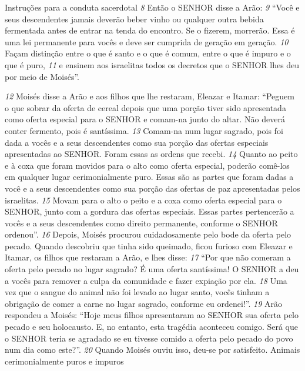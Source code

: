 \bigskip
Instruções para a conduta sacerdotal 
\textit{\tiny 8} 
Então o SENHOR disse a Arão: 
\textit{\tiny 9} 
“Você e seus descendentes jamais deverão beber
vinho ou qualquer outra bebida fermentada antes de entrar na tenda do encontro.
Se o fizerem, morrerão. Essa é uma lei permanente para vocês e deve ser
cumprida de geração em geração. 
\textit{\tiny 10}
Façam distinção entre o que é santo e o que é
comum, entre o que é impuro e o que é puro, 
\textit{\tiny 11}
e ensinem aos israelitas todos os
decretos que o SENHOR lhes deu por meio de Moisés”.

\bigskip
\textit{\tiny 12}
Moisés disse a Arão e aos filhos que lhe restaram, Eleazar e Itamar: “Peguem
o que sobrar da oferta de cereal depois que uma porção tiver sido apresentada
como oferta especial para o SENHOR e comam-na junto do altar. Não deverá conter
fermento, pois é santíssima. 
\textit{\tiny 13}
Comam-na num lugar sagrado, pois foi dada a
vocês e a seus descendentes como sua porção das ofertas especiais apresentadas
ao SENHOR. Foram essas as ordens que recebi. 
\textit{\tiny 14}
Quanto ao peito e à coxa que
foram movidos para o alto como oferta especial, poderão comê-los em qualquer
lugar cerimonialmente puro. Essas são as partes que foram dadas a você e a seus
descendentes como sua porção das ofertas de paz apresentadas pelos israelitas.
\textit{\tiny 15}
Movam para o alto o peito e a coxa como oferta especial para o SENHOR, junto
com a gordura das ofertas especiais. Essas partes pertencerão a vocês e a seus
descendentes como direito permanente, conforme o SENHOR ordenou”.
\textit{\tiny 16}
Depois, Moisés procurou cuidadosamente pelo bode da oferta pelo pecado.
Quando descobriu que tinha sido queimado, ficou furioso com Eleazar e Itamar,
os filhos que restaram a Arão, e lhes disse: 
\textit{\tiny 17}
“Por que não comeram a oferta pelo
pecado no lugar sagrado? É uma oferta santíssima! O SENHOR a deu a vocês para
remover a culpa da comunidade e fazer expiação por ela. 
\textit{\tiny 18}
Uma vez que o sangue
do animal não foi levado ao lugar santo, vocês tinham a obrigação de comer a
carne no lugar sagrado, conforme eu ordenei!”.
\textit{\tiny 19}
Arão respondeu a Moisés: “Hoje meus filhos apresentaram ao SENHOR sua
oferta pelo pecado e seu holocausto. E, no entanto, esta tragédia aconteceu
comigo. Será que o SENHOR teria se agradado se eu tivesse comido a oferta pelo
pecado do povo num dia como este?”. 
\textit{\tiny 20}
Quando Moisés ouviu isso, deu-se por
satisfeito.
Animais cerimonialmente puros e impuros
   
